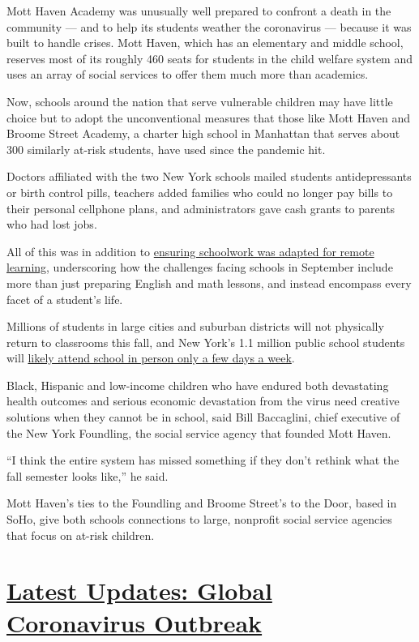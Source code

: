 Mott Haven Academy was unusually well prepared to confront a death in
the community --- and to help its students weather the coronavirus ---
because it was built to handle crises. Mott Haven, which has an
elementary and middle school, reserves most of its roughly 460 seats for
students in the child welfare system and uses an array of social
services to offer them much more than academics.

Now, schools around the nation that serve vulnerable children may have
little choice but to adopt the unconventional measures that those like
Mott Haven and Broome Street Academy, a charter high school in Manhattan
that serves about 300 similarly at-risk students, have used since the
pandemic hit.

Doctors affiliated with the two New York schools mailed students
antidepressants or birth control pills, teachers added families who
could no longer pay bills to their personal cellphone plans, and
administrators gave cash grants to parents who had lost jobs.

All of this was in addition to
\href{https://www.nytimes3xbfgragh.onion/2020/03/29/nyregion/coronavirus-new-york-schools-remote-learning.html}{ensuring
schoolwork was adapted for remote learning}, underscoring how the
challenges facing schools in September include more than just preparing
English and math lessons, and instead encompass every facet of a
student's life.

Millions of students in large cities and suburban districts will not
physically return to classrooms this fall, and New York's 1.1 million
public school students will
\href{https://www.nytimes3xbfgragh.onion/2020/07/08/nyregion/nyc-schools-reopening-plan.html}{likely
attend school in person only a few days a week}.

Black, Hispanic and low-income children who have endured both
devastating health outcomes and serious economic devastation from the
virus need creative solutions when they cannot be in school, said Bill
Baccaglini, chief executive of the New York Foundling, the social
service agency that founded Mott Haven.

``I think the entire system has missed something if they don't rethink
what the fall semester looks like,'' he said.

Mott Haven's ties to the Foundling and Broome Street's to the Door,
based in SoHo, give both schools connections to large, nonprofit social
service agencies that focus on at-risk children.

\hypertarget{latest-updates-global-coronavirus-outbreak}{%
\section{\texorpdfstring{\href{https://www.nytimes3xbfgragh.onion/2020/08/01/world/coronavirus-covid-19.html?action=click\&pgtype=Article\&state=default\&region=MAIN_CONTENT_1\&context=storylines_live_updates}{Latest
Updates: Global Coronavirus
Outbreak}}{Latest Updates: Global Coronavirus Outbreak}}\label{latest-updates-global-coronavirus-outbreak}}

